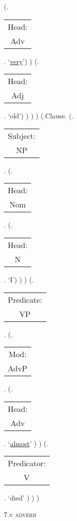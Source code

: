 \documentclass[12pt,letterpaper]{article}
\begin{document}
\begin{figure}
\begin{center}
\begin{parsetree}
			(.\begin{tabular}{c}Head:\\Adv\end{tabular}. `\underline{very}')
			)
			(.\begin{tabular}{c}Head:\\Adj\end{tabular}. `old')
			)
			)
			)
			(.Clause.
			(.\begin{tabular}{c}Subject:\\NP\end{tabular}.
			(.\begin{tabular}{c}Head:\\Nom\end{tabular}.
			(.\begin{tabular}{c}Head:\\N\end{tabular}. `I')
			)
			)
			(.\begin{tabular}{c}Predicate:\\VP\end{tabular}.
			(.\begin{tabular}{c}Mod:\\AdvP\end{tabular}. 
			(.\begin{tabular}{c}Head:\\Adv\end{tabular}. `\underline{almost}' )
			)
			(.\begin{tabular}{c}Predicator:\\V\end{tabular}. `died' )
			)
			)
			
			\hfill \break\hfill \break
		\end{parsetree}
		7.v \textsc{adverb}
	\end{center}
\end{figure}
\end{document}
